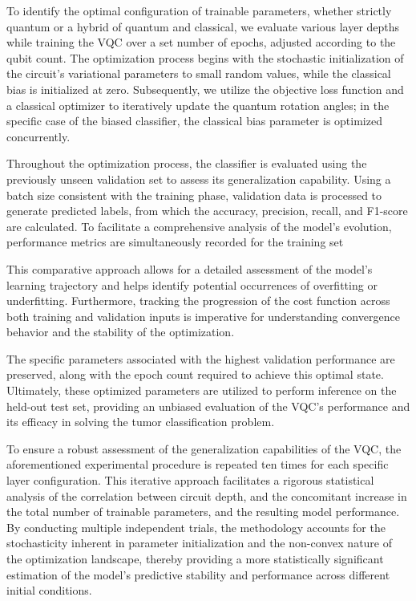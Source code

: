 \documentclass[en]{dimscthesis}
\begin{document}
To identify the optimal configuration of trainable parameters, whether strictly quantum or a hybrid of quantum and classical, we evaluate various layer depths while training the VQC over a set number of epochs, adjusted according to the qubit count. The optimization process begins with the stochastic initialization of the circuit’s variational parameters to small random values, while the classical bias is initialized at zero. Subsequently, we utilize the objective loss function and a classical optimizer to iteratively update the quantum rotation angles; in the specific case of the biased classifier, the classical bias parameter is optimized concurrently.

Throughout the optimization process, the classifier is evaluated using the previously unseen validation set to assess its generalization capability. Using a batch size consistent with the training phase, validation data is processed to generate predicted labels, from which the accuracy, precision, recall, and F1-score are calculated. To facilitate a comprehensive analysis of the model's evolution, performance metrics are simultaneously recorded for the training set

This comparative approach allows for a detailed assessment of the model's learning trajectory and helps identify potential occurrences of overfitting or underfitting. Furthermore, tracking the progression of the cost function across both training and validation inputs is imperative for understanding convergence behavior and the stability of the optimization.

The specific parameters associated with the highest validation performance are preserved, along with the epoch count required to achieve this optimal state. Ultimately, these optimized parameters are utilized to perform inference on the held-out test set, providing an unbiased evaluation of the VQC's performance and its efficacy in solving the tumor classification problem.

To ensure a robust assessment of the generalization capabilities of the VQC, the aforementioned experimental procedure is repeated ten times for each specific layer configuration. This iterative approach facilitates a rigorous statistical analysis of the correlation between circuit depth, and the concomitant increase in the total number of trainable parameters, and the resulting model performance. By conducting multiple independent trials, the methodology accounts for the stochasticity inherent in parameter initialization and the non-convex nature of the optimization landscape, thereby providing a more statistically significant estimation of the model’s predictive stability and performance across different initial conditions.
\end{document}
